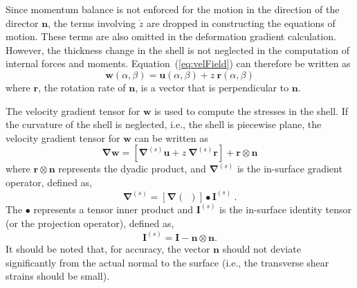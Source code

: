   Since momentum balance is not enforced for the motion in the direction
  of the director $\mathbf{n}$, the terms involving $\dot{z}$ are dropped
  in constructing the equations of motion.  These terms are also omitted
  in the deformation gradient calculation.  However, the thickness change
  in the shell is not neglected in the computation of internal forces and
  moments.  Equation~(\ref{eq:velField}) can therefore be written as
  \begin{equation}
    \mathbf{w}(\alpha,\beta) = \mathbf{u}(\alpha,\beta) 
        +z~\mathbf{r}(\alpha,\beta)
  \end{equation}
  where $\mathbf{r}$, the rotation rate of $\mathbf{n}$, is a vector
  that is perpendicular to $\mathbf{n}$.

  The velocity gradient tensor for $\mathbf{w}$ is used to compute the 
  stresses in the shell.
  If the curvature of the shell is neglected, i.e., the shell is piecewise
  plane, the velocity gradient tensor for $\mathbf{w}$ can be written
  as
  \begin{equation}
    \boldsymbol{\nabla}\mathbf{w} = \left[\boldsymbol{\nabla}^{(s)}\mathbf{u}+
        z~\boldsymbol{\nabla}^{(s)}\mathbf{r}\right] + 
        \mathbf{r}\otimes\mathbf{n}
     \label{eq:velGrad}
  \end{equation}
  where $\mathbf{r}\otimes\mathbf{n}$ represents the dyadic product, and 
  $\mathbf{\nabla}^{(s)}$ is the in-surface gradient operator, defined as,
  \begin{equation}
    \boldsymbol{\nabla}^{(s)} = \left[\boldsymbol{\nabla}(~~)\right]
                            \bullet\mathbf{I}^{(s)}~.
  \end{equation}
  The $\bullet$ represents a tensor inner product and $\mathbf{I}^{(s)}$
  is the in-surface identity tensor (or the projection operator), defined as,
  \begin{equation}
    \mathbf{I}^{(s)} = \mathbf{I} - \mathbf{n}\otimes\mathbf{n}.
  \end{equation}
  It should be noted that, for accuracy, the vector $\mathbf{n}$ should not
  deviate significantly from the actual normal to the surface (i.e., the
  transverse shear strains should be small).


